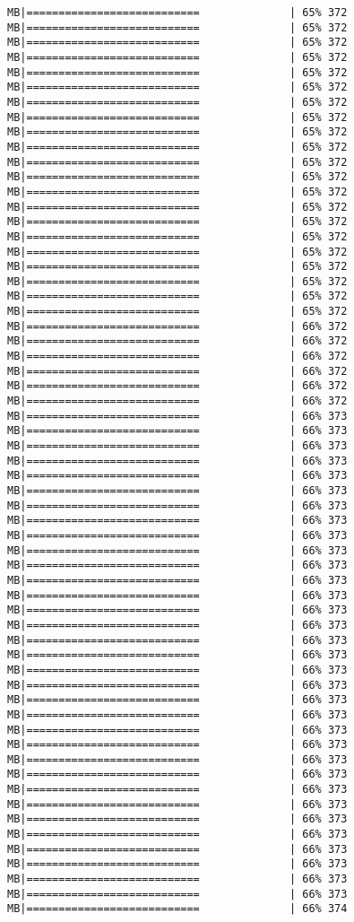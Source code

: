 \documentclass[
]{article}
\begin{document}
\begin{verbatim}
MB|===========================              | 65% 372 MB|===========================              | 65% 372 MB|===========================              | 65% 372 MB|===========================              | 65% 372 MB|===========================              | 65% 372 MB|===========================              | 65% 372 MB|===========================              | 65% 372 MB|===========================              | 65% 372 MB|===========================              | 65% 372 MB|===========================              | 65% 372 MB|===========================              | 65% 372 MB|===========================              | 65% 372 MB|===========================              | 65% 372 MB|===========================              | 65% 372 MB|===========================              | 65% 372 MB|===========================              | 65% 372 MB|===========================              | 65% 372 MB|===========================              | 65% 372 MB|===========================              | 65% 372 MB|===========================              | 65% 372 MB|===========================              | 65% 372 MB|===========================              | 66% 372 MB|===========================              | 66% 372 MB|===========================              | 66% 372 MB|===========================              | 66% 372 MB|===========================              | 66% 372 MB|===========================              | 66% 372 MB|===========================              | 66% 373 MB|===========================              | 66% 373 MB|===========================              | 66% 373 MB|===========================              | 66% 373 MB|===========================              | 66% 373 MB|===========================              | 66% 373 MB|===========================              | 66% 373 MB|===========================              | 66% 373 MB|===========================              | 66% 373 MB|===========================              | 66% 373 MB|===========================              | 66% 373 MB|===========================              | 66% 373 MB|===========================              | 66% 373 MB|===========================              | 66% 373 MB|===========================              | 66% 373 MB|===========================              | 66% 373 MB|===========================              | 66% 373 MB|===========================              | 66% 373 MB|===========================              | 66% 373 MB|===========================              | 66% 373 MB|===========================              | 66% 373 MB|===========================              | 66% 373 MB|===========================              | 66% 373 MB|===========================              | 66% 373 MB|===========================              | 66% 373 MB|===========================              | 66% 373 MB|===========================              | 66% 373 MB|===========================              | 66% 373 MB|===========================              | 66% 373 MB|===========================              | 66% 373 MB|===========================              | 66% 373 MB|===========================              | 66% 373 MB|===========================              | 66% 373 MB|===========================              | 66% 374 
\end{verbatim}
\end{document}
